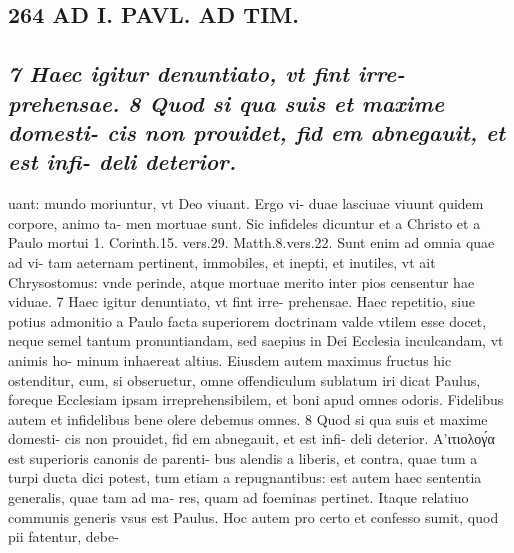 \documentclass{article}
\begin{document}
\begin{pages}
\section*{264 AD I. PAVL. AD TIM. }\pstart {}
{}
\subsection*{\textit{7 Haec igitur denuntiato, vt fint irre- prehensae. 8 Quod si qua suis et maxime domesti- cis non prouidet, fid em abnegauit, et est infi- deli deterior.}}uant: mundo moriuntur, vt Deo viuant. Ergo vi- duae lasciuae viuunt quidem corpore, animo ta- men mortuae sunt. Sic infideles dicuntur et a Christo et a Paulo mortui 1. Corinth.15. vers.29. Matth.8.vers.22. Sunt enim ad omnia quae ad vi- tam aeternam pertinent, immobiles, et inepti, et inutiles, vt ait Chrysostomus: vnde perinde, atque mortuae merito inter pios censentur hae viduae. 7 Haec igitur denuntiato, vt fint irre- prehensae. Haec repetitio, siue potius admonitio a Paulo facta superiorem doctrinam valde vtilem esse docet, neque semel tantum pronuntiandam, sed saepius in Dei Ecclesia inculcandam, vt animis ho- minum inhaereat altius. Eiusdem autem maximus fructus hic ostenditur, cum, si obseruetur, omne offendiculum sublatum iri dicat Paulus, foreque Ecclesiam ipsam irreprehensibilem, et boni apud omnes odoris. Fidelibus autem et infidelibus bene olere debemus omnes. 8 Quod si qua suis et maxime domesti- cis non prouidet, fid em abnegauit, et est infi- deli deterior. Α’ιτιολογ́α est superioris canonis de parenti- bus alendis a liberis, et contra, quae tum a turpi ducta dici potest, tum etiam a repugnantibus: est autem haec sententia generalis, quae tam ad ma- res, quam ad foeminas pertinet. Itaque relatiuo communis generis vsus est Paulus. Hoc autem pro certo et confesso sumit, quod pii fatentur, debe-  \pend

\end{pages}
\end{document}
